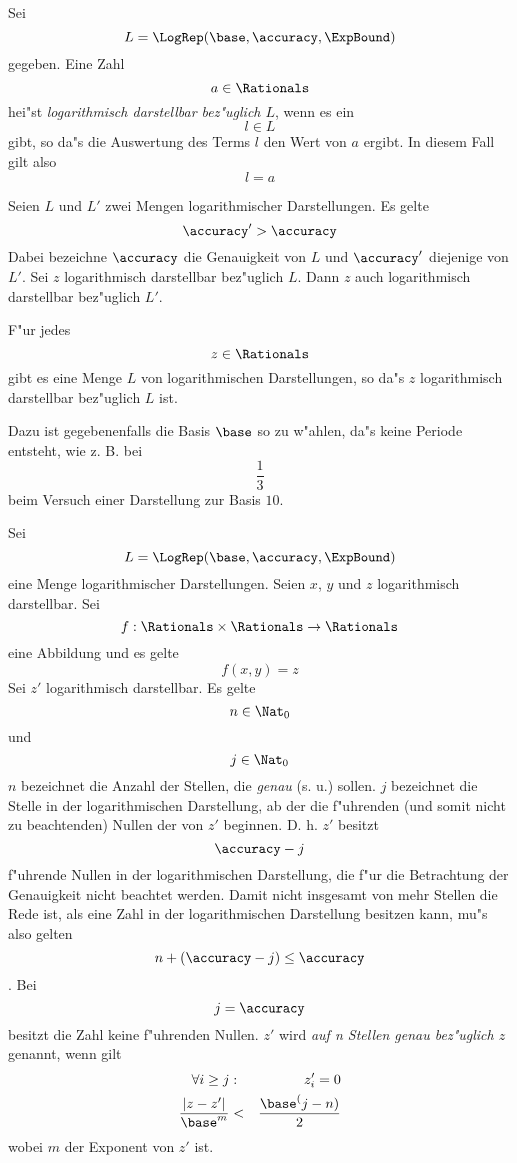 \MyBeginDef
    Sei \[ L = \LogRep(\base,\accuracy,\ExpBound) \] gegeben. Eine Zahl
    \[ a \in \Rationals \] hei"st {\em logarithmisch darstellbar
    bez"uglich $L$}, wenn es ein \[ l \in L \] gibt, so da"s die Auswertung
    des Terms $l$ den Wert von $a$ ergibt. In diesem Fall gilt also
    \[ l = a \]
\MyEndDef

\begin{bemerkung}
    Seien $L$ und $L'$ zwei Mengen logarithmischer Darstellungen. Es gelte
    \[ \accuracy' > \accuracy \] 
    Dabei bezeichne $\accuracy$ die Genauigkeit von $L$ und $\accuracy'$ 
    diejenige von $L'$. Sei $z$ logarithmisch darstellbar 
    bez"uglich $L$. Dann $z$ auch logarithmisch darstellbar bez"uglich
    $L'$.
\end{bemerkung}

\begin{bemerkung}
\label{OhnedivSatz4}
    F"ur jedes \[ z \in \Rationals \] gibt es eine Menge $L$ von
    logarithmischen Darstellungen, so da"s $z$ logarithmisch darstellbar
    bez"uglich $L$ ist. 

    Dazu ist gegebenenfalls die Basis $\base$ so zu w"ahlen, da"s keine
    Periode entsteht, wie z. B. bei \[ \frac{1}{3} \] beim Versuch einer
    Darstellung zur Basis $10$.
\end{bemerkung}

\MyBeginDef
    Sei \[ L = \LogRep(\base,\accuracy,\ExpBound) \] eine Menge 
    logarithmischer Darstellungen.
    Seien $x$, $y$ und $z$ logarithmisch darstellbar.
    Sei \[ f: \Rationals \times \Rationals \rightarrow \Rationals \]
    eine Abbildung und es gelte \[ f(x,y)=z \]
    Sei $z'$ logarithmisch darstellbar. Es gelte \[ n \in \Nat_0 \] und
    \[ j \in \Nat_0 \] $n$ bezeichnet die 
    Anzahl der Stellen, die {\em genau} (s. u.) sollen. $j$ bezeichnet die
    Stelle in der logarithmischen Darstellung, ab der die f"uhrenden 
    (und somit nicht zu beachtenden) Nullen der von $z'$ beginnen.
    D. h. $z'$ besitzt \[ \accuracy-j \] f"uhrende Nullen in der
    logarithmischen Darstellung, die f"ur die Betrachtung der Genauigkeit
    nicht beachtet werden.
    Damit nicht insgesamt von mehr Stellen die Rede ist, als
    eine Zahl in der logarithmischen Darstellung besitzen kann, mu"s
    also gelten \[ n+(\accuracy-j) \leq \accuracy \].
    Bei \[ j = \accuracy \] besitzt die Zahl keine f"uhrenden Nullen.
    $z'$ wird {\em auf n Stellen genau bez"uglich $z$} genannt, wenn gilt
    \begin{eqnarray*}
        \forall i \geq j & : & z'_i = 0 \\
        \frac{ |z - z'| }{ \base^m } & < & \frac{\base^(j-n)}{2} \\
    \end{eqnarray*}
    wobei $m$ der Exponent von $z'$ ist.


